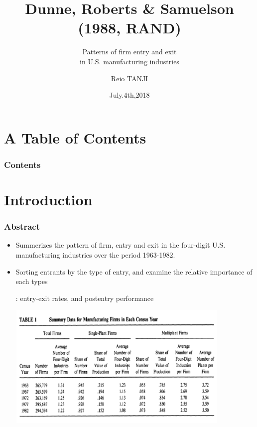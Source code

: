 \documentclass[dvipdfmx,14pt]{beamer}
\title{Dunne, Roberts \& Samuelson \\(1988, RAND)}
\subtitle{Patterns of firm entry and exit \\ in U.S. manufacturing industries}
\author{Reio TANJI}
\date{July.4th,2018}
\institute{Osaka University}
\begin{document}
\begin{frame}\frametitle{}
\titlepage
\end{frame}


\section*{A Table of Contents}
\begin{frame}\frametitle{Contents}
\tableofcontents
\end{frame}

\section{Introduction}
\begin{frame}\frametitle{Abstract}

 \begin{itemize}
 
 \item Summerizes the pattern of firm, entry and exit in the four-digit U.S. manufacturing industries over the period 1963-1982.
 
 \item Sorting entrants by the type of entry, and examine the relative importance of each types
 
 : entry-exit rates, and postentry performance
 
 \end{itemize}

\end{frame}

\begin{frame}

\begin{center}

\includegraphics[width=12cm,height=6cm]{DRS_T1.pdf}

\end{center}

\end{frame}
\end{document}
